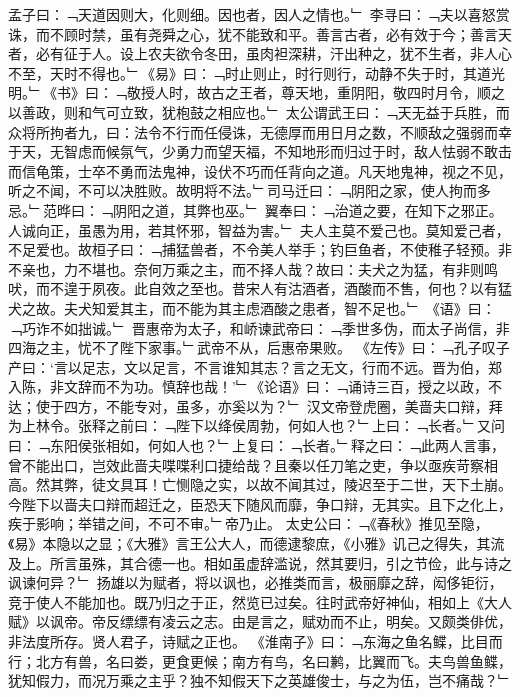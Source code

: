 孟子曰：﹁天道因则大，化则细。因也者，因人之情也。﹂
李寻曰：﹁夫以喜怒赏诛，而不顾时禁，虽有尧舜之心，犹不能致和平。善言古者，必有效于今；善言天者，必有征于人。设上农夫欲令冬田，虽肉袒深耕，汗出种之，犹不生者，非人心不至，天时不得也。﹂《易》曰：﹁时止则止，时行则行，动静不失于时，其道光明。﹂《书》曰：﹁敬授人时，故古之王者，尊天地，重阴阳，敬四时月令，顺之以善政，则和气可立致，犹枹鼓之相应也。﹂
太公谓武王曰：﹁天无益于兵胜，而众将所拘者九，曰：法令不行而任侵诛，无德厚而用日月之数，不顺敌之强弱而幸于天，无智虑而候氛气，少勇力而望天福，不知地形而归过于时，敌人怯弱不敢击而信龟策，士卒不勇而法鬼神，设伏不巧而任背向之道。凡天地鬼神，视之不见，听之不闻，不可以决胜败。故明将不法。﹂司马迁曰：﹁阴阳之家，使人拘而多忌。﹂范晔曰：﹁阴阳之道，其弊也巫。﹂
翼奉曰：﹁治道之要，在知下之邪正。人诚向正，虽愚为用，若其怀邪，智益为害。﹂
夫人主莫不爱己也。莫知爱己者，不足爱也。故桓子曰：﹁捕猛兽者，不令美人举手；钓巨鱼者，不使稚子轻预。非不亲也，力不堪也。奈何万乘之主，而不择人哉？故曰：夫犬之为猛，有非则鸣吠，而不遑于夙夜。此自效之至也。昔宋人有沽酒者，酒酸而不售，何也？以有猛犬之故。夫犬知爱其主，而不能为其主虑酒酸之患者，智不足也。﹂
《语》曰：﹁巧诈不如拙诚。﹂
晋惠帝为太子，和峤谏武帝曰：﹁季世多伪，而太子尚信，非四海之主，忧不了陛下家事。﹂武帝不从，后惠帝果败。
《左传》曰：﹁孔子叹子产曰：‘言以足志，文以足言，不言谁知其志？言之无文，行而不远。晋为伯，郑入陈，非文辞而不为功。慎辞也哉！’﹂《论语》曰：﹁诵诗三百，授之以政，不达；使于四方，不能专对，虽多，亦奚以为？﹂
汉文帝登虎圈，美啬夫口辩，拜为上林令。张释之前曰：﹁陛下以绛侯周勃，何如人也？﹂上曰：﹁长者。﹂又问曰：﹁东阳侯张相如，何如人也？﹂上复曰：﹁长者。﹂释之曰：﹁此两人言事，曾不能出口，岂效此啬夫喋喋利口捷给哉？且秦以任刀笔之吏，争以亟疾苛察相高。然其弊，徒文具耳！亡恻隐之实，以故不闻其过，陵迟至于二世，天下土崩。今陛下以啬夫口辩而超迁之，臣恐天下随风而靡，争口辩，无其实。且下之化上，疾于影响；举错之间，不可不审。﹂帝乃止。
太史公曰：﹁《春秋》推见至隐，《易》本隐以之显；《大雅》言王公大人，而德逮黎庶，《小雅》讥己之得失，其流及上。所言虽殊，其合德一也。相如虽虚辞滥说，然其要归，引之节俭，此与诗之讽谏何异？﹂
扬雄以为赋者，将以讽也，必推类而言，极丽靡之辞，闳侈钜衍，竞于使人不能加也。既乃归之于正，然览已过矣。往时武帝好神仙，相如上《大人赋》以讽帝。帝反缥缥有凌云之志。由是言之，赋劝而不止，明矣。又颇类俳优，非法度所存。贤人君子，诗赋之正也。
《淮南子》曰：﹁东海之鱼名鲽，比目而行；北方有兽，名曰娄，更食更候；南方有鸟，名曰鹣，比翼而飞。夫鸟兽鱼鲽，犹知假力，而况万乘之主乎？独不知假天下之英雄俊士，与之为伍，岂不痛哉？﹂
